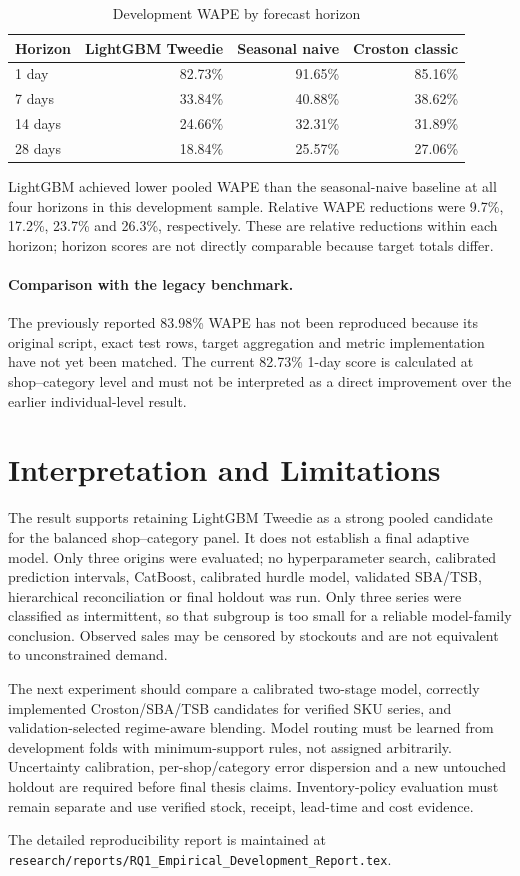 \begin{table}[H]
\centering
\caption{Development WAPE by forecast horizon}
\label{tab:rq1_development_wape}
\begin{tabular}{lrrr}
\toprule
Horizon & LightGBM Tweedie & Seasonal naive & Croston classic\\
\midrule
1 day  & 82.73\% & 91.65\% & 85.16\%\\
7 days & 33.84\% & 40.88\% & 38.62\%\\
14 days& 24.66\% & 32.31\% & 31.89\%\\
28 days& 18.84\% & 25.57\% & 27.06\%\\
\bottomrule
\end{tabular}
\end{table}

LightGBM achieved lower pooled WAPE than the seasonal-naive baseline at all
four horizons in this development sample. Relative WAPE reductions were
9.7\%, 17.2\%, 23.7\% and 26.3\%, respectively. These are relative reductions
within each horizon; horizon scores are not directly comparable because target
totals differ.

\paragraph{Comparison with the legacy benchmark.}
The previously reported 83.98\% WAPE has not been reproduced because its
original script, exact test rows, target aggregation and metric implementation
have not yet been matched. The current 82.73\% 1-day score is calculated at
shop--category level and must not be interpreted as a direct improvement over
the earlier individual-level result.
\section{Interpretation and Limitations}
The result supports retaining LightGBM Tweedie as a strong pooled candidate
for the balanced shop--category panel. It does not establish a final adaptive
model. Only three origins were evaluated; no hyperparameter search, calibrated
prediction intervals, CatBoost, calibrated hurdle model, validated SBA/TSB,
hierarchical reconciliation or final holdout was run. Only three series were
classified as intermittent, so that subgroup is too small for a reliable
model-family conclusion. Observed sales may be censored by stockouts and are
not equivalent to unconstrained demand.

The next experiment should compare a calibrated two-stage model, correctly
implemented Croston/SBA/TSB candidates for verified SKU series, and
validation-selected regime-aware blending. Model routing must be learned from
development folds with minimum-support rules, not assigned arbitrarily.
Uncertainty calibration, per-shop/category error dispersion and a new
untouched holdout are required before final thesis claims. Inventory-policy
evaluation must remain separate and use verified stock, receipt, lead-time
and cost evidence.

The detailed reproducibility report is maintained at
\texttt{research/reports/RQ1\_Empirical\_Development\_Report.tex}.
